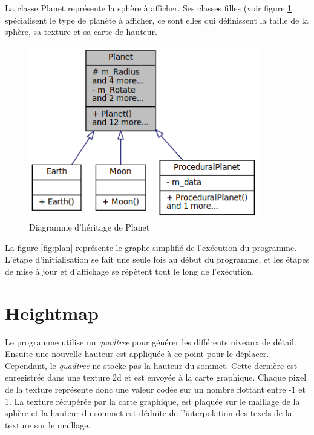   La classe Planet représente la sphère à afficher. Ses classes filles
  (voir figure \ref{fig:inh_planet} spécialisent le type de planète
  à afficher, ce sont elles qui définissent la taille de la sphère,
  sa texture et sa carte de hauteur.\\
  
  \begin{figure}
  \centering
  \includegraphics[width=10cm]{img/planet_inh.png}
  \caption{Diagramme d'héritage de Planet}
  \label{fig:inh_planet}
  \end{figure}
  
 
  La figure \ref{fig:plan} représente le graphe simplifié de
  l'exécution du programme. L'étape d'initialisation se fait une seule
  fois au début du programme, et les étapes de mise à jour et d'affichage
  se répètent tout le long de l'exécution.
  
\section{Heightmap}
  
  Le programme utilise un \emph{quadtree} pour générer les différents niveaux de détail. 
  Ensuite une nouvelle hauteur est appliquée à ce point pour le déplacer. 
  Cependant, le \emph{quadtree} ne stocke pas la hauteur du sommet. Cette dernière
  est enregistrée dans une texture 2d et est envoyée à la carte graphique. 
  Chaque pixel de la texture représente donc une valeur codée sur un nombre flottant entre -1 et 1.
  La texture récupérée par la carte graphique, est plaquée sur le maillage de la sphère et la hauteur du sommet
  est déduite de l'interpolation des texels de la texture sur le maillage.
  
